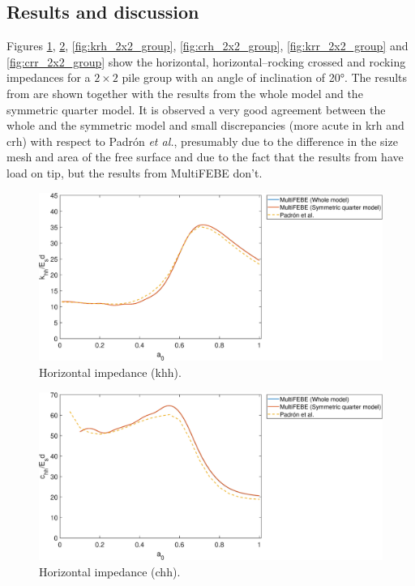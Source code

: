 \documentclass[a4]{article}
\begin{document}
\subsection{Results and discussion}

Figures \ref{fig:khh_2x2_group}, \ref{fig:chh_2x2_group}, \ref{fig:krh_2x2_group}, \ref{fig:crh_2x2_group}, \ref{fig:krr_2x2_group} and \ref{fig:crr_2x2_group} show the horizontal, horizontal–rocking crossed and rocking impedances for a $2 \times 2 $ pile group with an angle of inclination of 20°. The results from \cite{padron} are shown together with the results from the whole model and the symmetric quarter model. It is observed a very good agreement between the whole and the symmetric model and small discrepancies (more acute in krh and crh) with respect to Padrón \textit{et al.}, presumably due to the difference in the size mesh and area of the free surface and due to the fact that the results from \cite{padron} have load on tip, but the results from MultiFEBE don't. 

\begin{figure}[h!]
	\centering
	\includegraphics[scale=0.5]{khh_2x2_group.eps}
	\caption{Horizontal impedance (khh).}
	\label{fig:khh_2x2_group}
\end{figure}

\begin{figure}[h!]
	\centering
	\includegraphics[scale=0.5]{chh_2x2_group.eps}
	\caption{Horizontal impedance (chh).}
	\label{fig:chh_2x2_group}
\end{figure}
\end{document}
